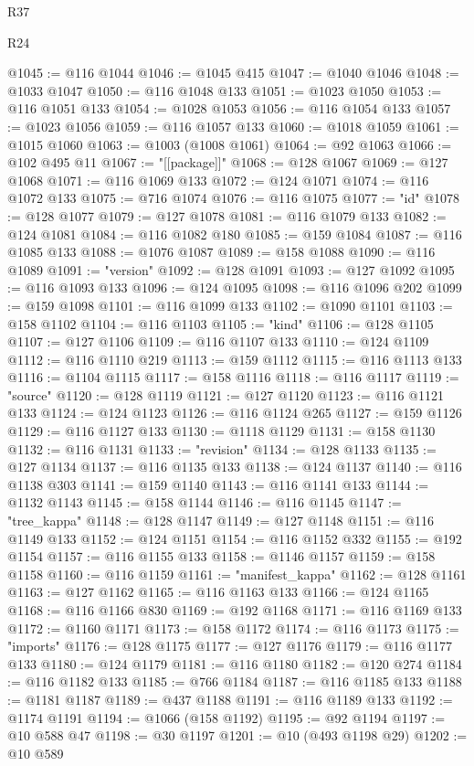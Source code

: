\begin{lexlean}{R37}
\begin{lexlean}{R24}
\begin{coremodule}
{{{{{{{{{{{{{{{{{{{{{{{{{{{{{{{{{{{{{{{{{{{{{{{{{{{{{{{{{{{{{{{{{{{{{{{{{{{{{{{{{{{{{{{{{{{{{{{{{{{{{{{{{{{{{{{{{{{{{{{{{{{{{{{{{{{{{{{{{{{{{{{{{{{{{{{{{{{{{{{{{{{{{{{{{{{{{{{{{{{{{{{{{@1045 := @116 @1044
@1046 := @1045 @415
@1047 := @1040 @1046
@1048 := @1033 @1047
@1050 := @116 @1048 @133
@1051 := @1023 @1050
@1053 := @116 @1051 @133
@1054 := @1028 @1053
@1056 := @116 @1054 @133
@1057 := @1023 @1056
@1059 := @116 @1057 @133
@1060 := @1018 @1059
@1061 := @1015 @1060
@1063 := @1003 (@1008 @1061)
@1064 := @92 @1063
@1066 := @102 @495 @11
@1067 := "[[package]]"
@1068 := @128 @1067
@1069 := @127 @1068
@1071 := @116 @1069 @133
@1072 := @124 @1071
@1074 := @116 @1072 @133
@1075 := @716 @1074
@1076 := @116 @1075
@1077 := "id"
@1078 := @128 @1077
@1079 := @127 @1078
@1081 := @116 @1079 @133
@1082 := @124 @1081
@1084 := @116 @1082 @180
@1085 := @159 @1084
@1087 := @116 @1085 @133
@1088 := @1076 @1087
@1089 := @158 @1088
@1090 := @116 @1089
@1091 := "version"
@1092 := @128 @1091
@1093 := @127 @1092
@1095 := @116 @1093 @133
@1096 := @124 @1095
@1098 := @116 @1096 @202
@1099 := @159 @1098
@1101 := @116 @1099 @133
@1102 := @1090 @1101
@1103 := @158 @1102
@1104 := @116 @1103
@1105 := "kind"
@1106 := @128 @1105
@1107 := @127 @1106
@1109 := @116 @1107 @133
@1110 := @124 @1109
@1112 := @116 @1110 @219
@1113 := @159 @1112
@1115 := @116 @1113 @133
@1116 := @1104 @1115
@1117 := @158 @1116
@1118 := @116 @1117
@1119 := "source"
@1120 := @128 @1119
@1121 := @127 @1120
@1123 := @116 @1121 @133
@1124 := @124 @1123
@1126 := @116 @1124 @265
@1127 := @159 @1126
@1129 := @116 @1127 @133
@1130 := @1118 @1129
@1131 := @158 @1130
@1132 := @116 @1131
@1133 := "revision"
@1134 := @128 @1133
@1135 := @127 @1134
@1137 := @116 @1135 @133
@1138 := @124 @1137
@1140 := @116 @1138 @303
@1141 := @159 @1140
@1143 := @116 @1141 @133
@1144 := @1132 @1143
@1145 := @158 @1144
@1146 := @116 @1145
@1147 := "tree_kappa"
@1148 := @128 @1147
@1149 := @127 @1148
@1151 := @116 @1149 @133
@1152 := @124 @1151
@1154 := @116 @1152 @332
@1155 := @192 @1154
@1157 := @116 @1155 @133
@1158 := @1146 @1157
@1159 := @158 @1158
@1160 := @116 @1159
@1161 := "manifest_kappa"
@1162 := @128 @1161
@1163 := @127 @1162
@1165 := @116 @1163 @133
@1166 := @124 @1165
@1168 := @116 @1166 @830
@1169 := @192 @1168
@1171 := @116 @1169 @133
@1172 := @1160 @1171
@1173 := @158 @1172
@1174 := @116 @1173
@1175 := "imports"
@1176 := @128 @1175
@1177 := @127 @1176
@1179 := @116 @1177 @133
@1180 := @124 @1179
@1181 := @116 @1180
@1182 := @120 @274
@1184 := @116 @1182 @133
@1185 := @766 @1184
@1187 := @116 @1185 @133
@1188 := @1181 @1187
@1189 := @437 @1188
@1191 := @116 @1189 @133
@1192 := @1174 @1191
@1194 := @1066 (@158 @1192)
@1195 := @92 @1194
@1197 := @10 @588 @47
@1198 := @30 @1197
@1201 := @10 (@493 @1198 @29)
@1202 := @10 @589
}}}}}}}}}}}}}}}}}}}}}}}}}}}}}}}}}}}}}}}}}}}}}}}}}}}}}}}}}}}}}}}}}}}}}}}}}}}}}}}}}}}}}}}}}}}}}}}}}}}}}}}}}}}}}}}}}}}}}}}}}}}}}}}}}}}}}}}}}}}}}}}}}}}}}}}}}}}}}}}}}}}}}}}}}}}}}}}}}}}}}}}}}
\end{coremodule}
\end{lexlean}
\end{lexlean}
